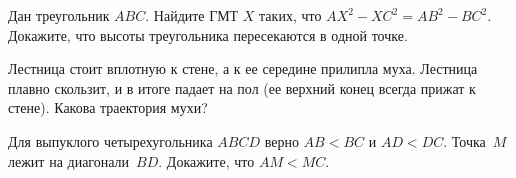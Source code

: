 \begin{problems}
\item
\subproblem
Дан треугольник $ABC$.
Найдите ГМТ $X$ таких, что $AX^2 - XC^2 = AB^2 - BC^2$.
\\
\subproblem
Докажите, что высоты треугольника пересекаются в одной точке.

\item
Лестница стоит вплотную к стене, а к ее середине прилипла муха.
Лестница плавно скользит, и в итоге падает на пол
(ее верхний конец всегда прижат к стене).
Какова траектория мухи?

\item
Для выпуклого четырехугольника $ABCD$ верно $AB < BC$ и $AD < DC$.
Точка~$M$ лежит на диагонали~$BD$.
Докажите, что $AM < MC$.

\end{problems}

